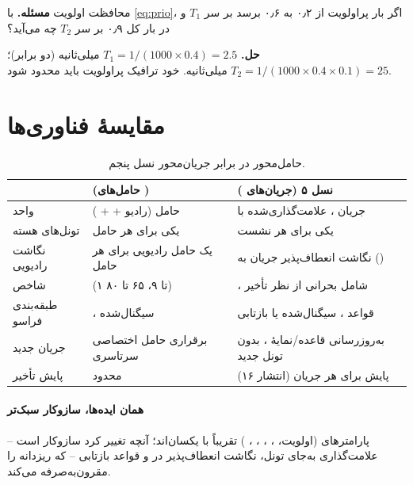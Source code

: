 \documentclass[11pt,a4paper]{article}
\begin{document}
\begin{examplebox}{محافظت اولویت}\label{ex:prio}
\textbf{مسئله.} با \cref{eq:prio}، اگر بار پراولویت از ۰٫۲ به ۰٫۶ برسد بر سر $T_1$ و در بار کل ۰٫۹ بر سر $T_2$ چه می‌آید؟

\textbf{حل.} $T_1 = 1/(1000\times0.4) = 2.5$ میلی‌ثانیه (دو برابر)؛ $T_2 = 1/(1000\times0.4\times0.1) = 25$ میلی‌ثانیه. خود ترافیک پراولویت باید محدود
شود.
\end{examplebox}

\section{مقایسهٔ فناوری‌ها}
\begin{table}[htbp]
\centering\small
\caption{ حامل‌محور  در برابر  جریان‌محور نسل پنجم.}\label{tab:cmp}
\begin{tabularx}{\linewidth}{@{}l Y Y@{}}
\toprule
{} &  (حامل‌های ) & نسل ۵ (جریان‌های ) \\
\midrule
واحد        & حامل  (رادیو +  + )    & جریان ، علامت‌گذاری‌شده با  \\
تونل‌های هسته         & یکی برای هر حامل                            & یکی برای هر نشست  \\
نگاشت رادیویی         & یک حامل رادیویی برای هر حامل        & نگاشت انعطاف‌پذیر جریان به  () \\
شاخص        &  (۱ تا ۹، ۶۵ تا ۸۰)                 & ، شامل  بحرانی از نظر تأخیر \\
طبقه‌بندی فراسو       & ، سیگنال‌شده                      & قواعد ، سیگنال‌شده یا بازتابی \\
جریان جدید            & برقراری حامل اختصاصی سرتاسری                & به‌روزرسانی قاعده/نمایهٔ ، بدون تونل جدید \\
پایش تأخیر            & محدود                                       & پایش  برای هر جریان (انتشار ۱۶) \\
\bottomrule
\end{tabularx}
\end{table}

\paragraph{همان ایده‌ها، سازوکار سبک‌تر} پارامترهای  (اولویت، ، ، ، ، ) تقریباً با
 یکسان‌اند؛ آنچه تغییر کرد سازوکار است -- علامت‌گذاری به‌جای تونل، نگاشت انعطاف‌پذیر در  و قواعد بازتابی -- که
 ریزدانه را مقرون‌به‌صرفه می‌کند.
\end{document}
